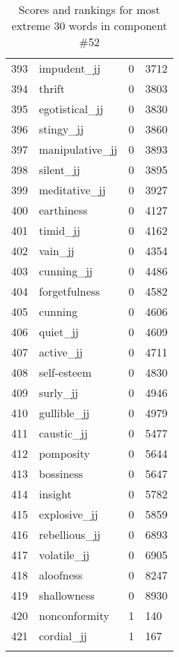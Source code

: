 \begin{longtable}[!htbp]{| rlr@{.}l |}
    393 & impudent\_jj & 0 & 3712 \\
    394 & thrift & 0 & 3803 \\
    395 & egotistical\_jj & 0 & 3830 \\
    396 & stingy\_jj & 0 & 3860 \\
    397 & manipulative\_jj & 0 & 3893 \\
    398 & silent\_jj & 0 & 3895 \\
    399 & meditative\_jj & 0 & 3927 \\
    400 & earthiness & 0 & 4127 \\
    401 & timid\_jj & 0 & 4162 \\
    402 & vain\_jj & 0 & 4354 \\
    403 & cunning\_jj & 0 & 4486 \\
    404 & forgetfulness & 0 & 4582 \\
    405 & cunning & 0 & 4606 \\
    406 & quiet\_jj & 0 & 4609 \\
    407 & active\_jj & 0 & 4711 \\
    408 & self-esteem & 0 & 4830 \\
    409 & surly\_jj & 0 & 4946 \\
    410 & gullible\_jj & 0 & 4979 \\
    411 & caustic\_jj & 0 & 5477 \\
    412 & pomposity & 0 & 5644 \\
    413 & bossiness & 0 & 5647 \\
    414 & insight & 0 & 5782 \\
    415 & explosive\_jj & 0 & 5859 \\
    416 & rebellious\_jj & 0 & 6893 \\
    417 & volatile\_jj & 0 & 6905 \\
    418 & aloofness & 0 & 8247 \\
    419 & shallowness & 0 & 8930 \\
    420 & nonconformity & 1 & 140 \\
    421 & cordial\_jj & 1 & 167 \\
    \hline
    \caption{Scores and rankings for most extreme 30 words in component \#52} \\
\end{longtable}
